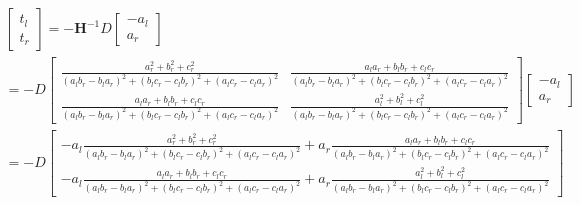 \begin{equation} 
\begin{gathered}
\left[ {\begin{array}{*{20}{c}}
	{{t_l}} \\ 
	{{t_r}} 
	\end{array}} \right] =  - {{\mathbf{H}}^{ - 1}}D\left[ {\begin{array}{*{20}{c}}
	{ - {a_l}} \\ 
	{{a_r}} 
	\end{array}} \right] \\ 
=  - D\left[ {\begin{array}{*{20}{c}}
	{\frac{{a_r^2 + b_r^2 + c_r^2}}{{{{\left( {{a_l}{b_r} - {b_l}{a_r}} \right)}^2} + {{\left( {{b_l}{c_r} - {c_l}{b_r}} \right)}^2} + {{\left( {{a_l}{c_r} - {c_l}{a_r}} \right)}^2}}}}&{\frac{{{a_l}{a_r} + {b_l}{b_r} + {c_l}{c_r}}}{{{{\left( {{a_l}{b_r} - {b_l}{a_r}} \right)}^2} + {{\left( {{b_l}{c_r} - {c_l}{b_r}} \right)}^2} + {{\left( {{a_l}{c_r} - {c_l}{a_r}} \right)}^2}}}} \\ 
	{\frac{{{a_l}{a_r} + {b_l}{b_r} + {c_l}{c_r}}}{{{{\left( {{a_l}{b_r} - {b_l}{a_r}} \right)}^2} + {{\left( {{b_l}{c_r} - {c_l}{b_r}} \right)}^2} + {{\left( {{a_l}{c_r} - {c_l}{a_r}} \right)}^2}}}}&{\frac{{a_l^2 + b_l^2 + c_l^2}}{{{{\left( {{a_l}{b_r} - {b_l}{a_r}} \right)}^2} + {{\left( {{b_l}{c_r} - {c_l}{b_r}} \right)}^2} + {{\left( {{a_l}{c_r} - {c_l}{a_r}} \right)}^2}}}} 
	\end{array}} \right]\left[ {\begin{array}{*{20}{c}}
	{ - {a_l}} \\ 
	{{a_r}} 
	\end{array}} \right] \\ 
=  - D\left[ {\begin{array}{*{20}{c}}
	{ - {a_l}\frac{{a_r^2 + b_r^2 + c_r^2}}{{{{\left( {{a_l}{b_r} - {b_l}{a_r}} \right)}^2} + {{\left( {{b_l}{c_r} - {c_l}{b_r}} \right)}^2} + {{\left( {{a_l}{c_r} - {c_l}{a_r}} \right)}^2}}} + {a_r}\frac{{{a_l}{a_r} + {b_l}{b_r} + {c_l}{c_r}}}{{{{\left( {{a_l}{b_r} - {b_l}{a_r}} \right)}^2} + {{\left( {{b_l}{c_r} - {c_l}{b_r}} \right)}^2} + {{\left( {{a_l}{c_r} - {c_l}{a_r}} \right)}^2}}}} \\ 
	{ - {a_l}\frac{{{a_l}{a_r} + {b_l}{b_r} + {c_l}{c_r}}}{{{{\left( {{a_l}{b_r} - {b_l}{a_r}} \right)}^2} + {{\left( {{b_l}{c_r} - {c_l}{b_r}} \right)}^2} + {{\left( {{a_l}{c_r} - {c_l}{a_r}} \right)}^2}}} + {a_r}\frac{{a_l^2 + b_l^2 + c_l^2}}{{{{\left( {{a_l}{b_r} - {b_l}{a_r}} \right)}^2} + {{\left( {{b_l}{c_r} - {c_l}{b_r}} \right)}^2} + {{\left( {{a_l}{c_r} - {c_l}{a_r}} \right)}^2}}}} 
	\end{array}} \right] \\ 
\end{gathered}
\end{equation}
